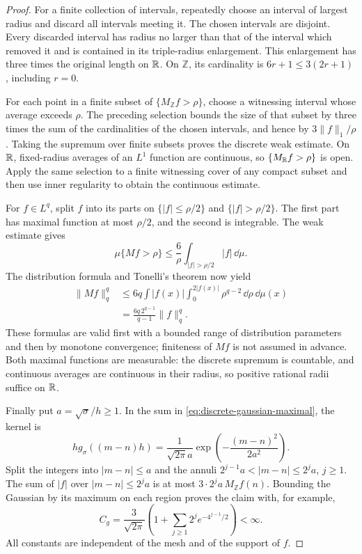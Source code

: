 \begin{proof}
For a finite collection of intervals, repeatedly choose an interval of
largest radius and discard all intervals meeting it.  The chosen
intervals are disjoint.  Every discarded interval has radius no larger
than that of the interval which removed it and is contained in its
triple-radius enlargement.  This enlargement has three times the
original length on $\mathbb R$.  On $\mathbb Z$, its cardinality is
$6r+1\le3(2r+1)$, including $r=0$.

For each point in a finite subset of $\{M_{\mathbb Z}f>\rho\}$, choose
a witnessing interval whose average exceeds $\rho$.  The preceding
selection bounds the size of that subset by three times the sum of
the cardinalities of the chosen intervals, and hence by
$3\|f\|_1/\rho$.  Taking the supremum over finite subsets proves the
discrete weak estimate.  On $\mathbb R$, fixed-radius averages of an
$L^1$ function are continuous, so $\{M_{\mathbb R}f>\rho\}$ is open.
Apply the same selection to a finite witnessing cover of any compact
subset and then use inner regularity to obtain the continuous estimate.

For $f\in L^q$, split $f$ into its parts on $\{|f|\le\rho/2\}$ and
$\{|f|>\rho/2\}$.  The first part has maximal function at most
$\rho/2$, and the second is integrable.  The weak estimate gives
\[
 \mu\{Mf>\rho\}
 \le\frac6\rho\int_{|f|>\rho/2}|f|\,\dd\mu.
\]
The distribution formula and Tonelli's theorem now yield
\[
 \begin{aligned}
 \|Mf\|_q^q
 &\le6q\int |f(x)|
          \int_0^{2|f(x)|}\rho^{q-2}\,\dd\rho\,\dd\mu(x)\\
 &=\frac{6q\,2^{q-1}}{q-1}\|f\|_q^q.
 \end{aligned}
\]
These formulas are valid first with a bounded range of distribution
parameters and then by monotone convergence; finiteness of $Mf$ is
not assumed in advance.  Both maximal functions are measurable: the
discrete supremum is countable, and continuous averages are continuous
in their radius, so positive rational radii suffice on $\mathbb R$.

Finally put $a=\sqrt\sigma/h\ge1$.  In the sum in
\eqref{eq:discrete-gaussian-maximal}, the kernel is
\[
 h g_\sigma((m-n)h)
   =\frac1{\sqrt{2\pi}a}
       \exp\left(-\frac{(m-n)^2}{2a^2}\right).
\]
Split the integers into $|m-n|\le a$ and the annuli
$2^{j-1}a<|m-n|\le2^ja$, $j\ge1$.  The sum of $|f|$ over
$|m-n|\le2^ja$ is at most $3\cdot2^ja\,M_{\mathbb Z}f(n)$.
Bounding the Gaussian by its maximum on each region proves the claim
with, for example,
\[
 C_g=\frac3{\sqrt{2\pi}}
 \left(1+\sum_{j\ge1}2^j e^{-4^{j-1}/2}\right)<\infty.
\]
All constants are independent of the mesh and of the support of $f$.
\end{proof}

